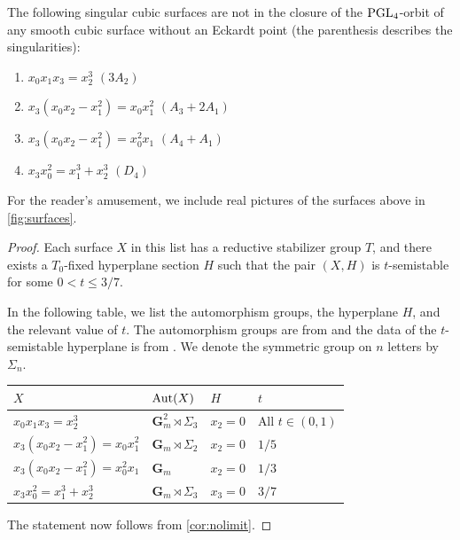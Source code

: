 \documentclass[12pt,reqno]{amsart}
\numberwithin{equation}{section}
\newcommand{\G}{\mathbf G}
\begin{document}
\begin{proposition}
  The following singular cubic surfaces are not in the closure of the $\operatorname{PGL}_4$-orbit of any smooth cubic surface without an Eckardt point (the parenthesis describes the singularities):
  \begin{enumerate}
  \item $x_0x_1x_3 = x_2^3$ \quad $(3A_2)$
  \item $x_3(x_0x_2-x_1^2) = x_0x_1^2$ \quad $(A_3 + 2A_1)$
  \item $x_3(x_0x_2-x_1^2) = x_0^2x_1$ \quad $(A_4 + A_1)$
  \item $x_3x_0^2 = x_1^3 + x_2^3$ \quad $(D_4)$
  \end{enumerate}
\end{proposition}
For the reader's amusement, we include real pictures of the surfaces above in \autoref{fig:surfaces}.
\begin{proof}
  Each surface $X$ in this list has a reductive stabilizer group $T$, and there exists a $T_0$-fixed hyperplane section $H$ such that the pair $(X, H)$ is $t$-semistable for some $0 < t \leq 3/7$.

  In the following table, we list the automorphism groups, the hyperplane $H$, and the relevant value of $t$.
  The automorphism groups are from \cite[Theorem~3]{sak:10} and the data of the $t$-semistable hyperplane is from \cite[Table~2]{gal.mar:19}.
  We denote the symmetric group on $n$ letters by $\Sigma_n$.
  \begin{center}
  \begin{tabular}{l l l l}
    \toprule
    $X$ & $\operatorname{Aut}(X)$ & $H$ & $t$\\
    \midrule
    $x_0x_1x_3 = x_2^3$& $\G_m^2 \rtimes \Sigma_3$ & $x_2 = 0$ & All $t \in (0,1)$\\
    $x_3(x_0x_2-x_1^2) = x_0x_1^2$& $\G_m \rtimes \Sigma_2$ & $x_2 = 0$ & $1/5$ \\
    $x_3(x_0x_2-x_1^2) = x_0^2x_1$& $\G_m$ & $x_2 = 0$ & $1/3$\\
    $x_3x_0^2 = x_1^3 + x_2^3$& $\G_m \rtimes \Sigma_3$ & $x_3 = 0$ & $3/7$\\
    \bottomrule
  \end{tabular}
\end{center}
The statement now follows from  \autoref{cor:nolimit}.
\end{proof}
\end{document}
